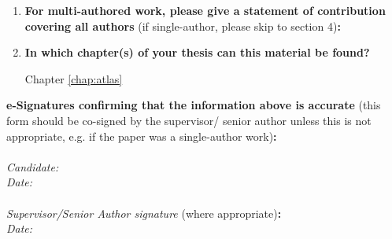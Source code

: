 {\begin{enumerate}[leftmargin=*,label={\bfseries\arabic*.}]
\begin{enumerate}[label={\alph*)}]
	Proceedings of the 
	\item \textbf{List the manuscript's authors in the intended authorship order:}

	\item \textbf{Stage of publication:}

	Work presented at conference, copyright transferred to IEEE, yet now indication of if/when proceedings may be published (copyright on submitted version retained).
\end{enumerate}

\item \textbf{For multi-authored work, please give a statement of contribution covering all authors} (if single-author, please skip to section 4)\textbf{:}
\item \textbf{In which chapter(s) of your thesis can this material be found?}

Chapter \ref{chap:atlas}
\end{enumerate}

\textbf{e-Signatures confirming that the information above is accurate}
(this form should be co-signed by the supervisor/ senior author unless this is not appropriate, e.g. if the paper was a single-author work)\textbf{:}\\
\\[\baselineskip]
\textit{Candidate:}
\\[\baselineskip]
\textit{Date:}\\\signdate
\\[\baselineskip]
\textit{Supervisor/Senior Author signature} (where appropriate)\textbf{:}
\\[\baselineskip]
\textit{Date:}\\\signdate
%

}
